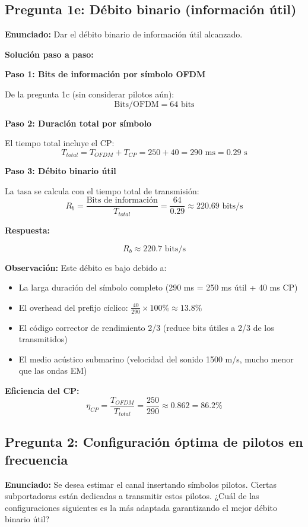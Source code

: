 \documentclass[11pt,a4paper]{article}
\begin{document}
\subsection*{Pregunta 1e: Débito binario (información útil)}

\textbf{Enunciado:} Dar el débito binario de información útil alcanzado.

\vspace{0.3cm}
\textbf{Solución paso a paso:}

\textbf{Paso 1: Bits de información por símbolo OFDM}

De la pregunta 1c (sin considerar pilotos aún):
\[
\text{Bits/OFDM} = 64 \text{ bits}
\]

\textbf{Paso 2: Duración total por símbolo}

El tiempo total incluye el CP:
\[
T_{total} = T_{OFDM} + T_{CP} = 250 + 40 = 290 \text{ ms} = 0.29 \text{ s}
\]

\textbf{Paso 3: Débito binario útil}

La tasa se calcula con el tiempo total de transmisión:
\[
R_b = \frac{\text{Bits de información}}{T_{total}} = \frac{64}{0.29} \approx 220.69 \text{ bits/s}
\]

\textbf{Respuesta:}

\[
\boxed{R_b \approx 220.7 \text{ bits/s}}
\]

\textbf{Observación:} Este débito es bajo debido a:
\begin{itemize}
    \item La larga duración del símbolo completo (290 ms = 250 ms útil + 40 ms CP)
    \item El overhead del prefijo cíclico: $\frac{40}{290} \times 100\% \approx 13.8\%$
    \item El código corrector de rendimiento 2/3 (reduce bits útiles a 2/3 de los transmitidos)
    \item El medio acústico submarino (velocidad del sonido 1500 m/s, mucho menor que las ondas EM)
\end{itemize}

\textbf{Eficiencia del CP:}
\[
\eta_{CP} = \frac{T_{OFDM}}{T_{total}} = \frac{250}{290} \approx 0.862 = 86.2\%
\]

\subsection*{Pregunta 2: Configuración óptima de pilotos en frecuencia}

\textbf{Enunciado:} Se desea estimar el canal insertando símbolos pilotos. Ciertas subportadoras están dedicadas a transmitir estos pilotos. ¿Cuál de las configuraciones siguientes es la más adaptada garantizando el mejor débito binario útil?
\end{document}
